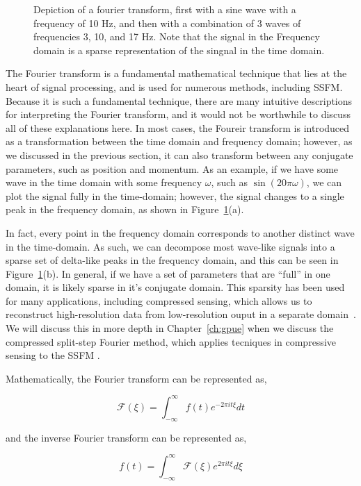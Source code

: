 \begin{figure}
\begin{centering}
\end{centering}

\caption{Depiction of a fourier transform, first with a sine wave with a frequency of 10 Hz, and then with a combination of 3 waves of frequencies 3, 10, and 17 Hz. Note that the signal in the Frequency domain is a sparse representation of the singnal in the time domain.}
\label{fig:FT}
\end{figure}

The Fourier transform is a fundamental mathematical technique that lies at the heart of signal processing, and is used for numerous methods, including SSFM.
Because it is such a fundamental technique, there are many intuitive descriptions for interpreting the Fourier transform, and it would not be worthwhile to discuss all of these explanations here.
In most cases, the Foureir transform is introduced as a transformation between the time domain and frequency domain; however, as we discussed in the previous section, it can also transform between any conjugate parameters, such as position and momentum.
As an example, if we have some wave in the time domain with some frequency $\omega$, such as $\sin(20\pi\omega)$, we can plot the signal fully in the time-domain; however, the signal changes to a single peak in the frequency domain, as shown in Figure~\ref{fig:FT}(a).

In fact, every point in the frequency domain corresponds to another distinct wave in the time-domain.
As such, we can decompose most wave-like signals into a sparse set of delta-like peaks in the frequency domain, and this can be seen in Figure~\ref{fig:FT}(b).
In general, if we have a set of parameters that are ``full'' in one domain, it is likely sparse in it's conjugate domain.
This sparsity has been used for many applications, including compressed sensing, which allows us to reconstruct high-resolution data from low-resolution ouput in a separate domain~\cite{baraniuk2011}.
We will discuss this in more depth in Chapter~\ref{ch:gpue} when we discuss the compressed split-step Fourier method, which applies tecniques in compressive sensing to the SSFM \cite{bayindir2015}.

Mathematically, the Fourier transform can be represented as,

$$
\mathcal{F}(\xi) = \int_{-\infty}^{\infty}f(t)e^{-2\pi i t \xi}dt
$$

\noindent and the inverse Fourier transform can be represented as,

$$
f(t) = \int_{-\infty}^{\infty}\mathcal{F}(\xi)e^{2\pi i t \xi}d\xi
$$

